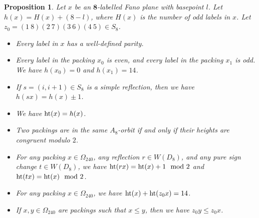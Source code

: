 \documentclass{amsart}
\theoremstyle{plain}
\newtheorem{prop}[theorem]{Proposition}
\theoremstyle{definition}
\theoremstyle{remark}
\numberwithin{equation}{section}
\newcommand{\rootht}{\text{\rm ht}}
\newcommand{\eight}{{\mathbf 8}}
\newcommand{\qpx}{\Omega_{240}}
\begin{document}
\begin{prop}\label{prop:nonrec}
Let $x$ be an $\eight$-labelled Fano plane with basepoint $l$. Let $h(x) = H(x) + (8-l)$, where $H(x)$ is the 
number of odd labels in $x$. Let $z_0= (1\ 8)(2\ 7)(3\ 6)(4\ 5) \in S_8$.
\begin{itemize}
\item[{\rm (i)}]{Every label in $x$ has a well-defined parity.}
\item[{\rm (ii)}]{Every label in the packing $x_0$ is even, and every label in the packing $x_1$ is odd.
We have $h(x_0) = 0$ and $h(x_1) = 14$.}
\item[{\rm (iii)}]{If $s = (i, i+1) \in S_8$ is a simple reflection, then we have $h(sx) = h(x) \pm 1$.}
\item[{\rm (iv)}]{We have $\rootht(x) = h(x)$.}
\item[{\rm (v)}]{Two packings are in the same $A_8$-orbit if and only if their heights are congruent modulo $2$.}
\item[{\rm (vi)}]{For any packing $x \in \qpx$, any reflection $r \in W(D_8)$, and any pure sign change $t \in W(D_8)$,
we have $\rootht(rx) = \rootht(x) + 1 \mod 2$ and $\rootht(tx) = \rootht(x) \mod 2$.}
\item[{\rm (vii)}]{For any packing $x \in \qpx$, we have $\rootht(x) + \rootht(z_0 x) = 14$.}
\item[{\rm (viii)}]{If $x, y \in \qpx$ are packings such that $x \leq y$, then we have $z_0 y \leq z_0 x$.}
\end{itemize}
\end{prop}
\end{document}
